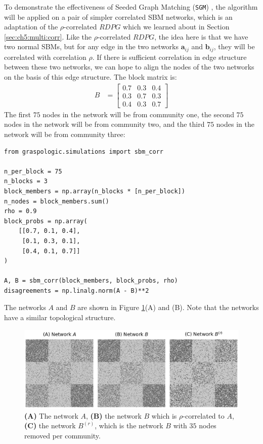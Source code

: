 To demonstrate the effectiveness of Seeded Graph Matching (\texttt{SGM}) \cite{Fishkind2019Mar, Lyzinski2014Jan}, the algorithm will be applied on a pair of simpler correlated SBM networks, which is an adaptation of the $\rho$-correlated $RDPG$ which we learned about in Section \ref{sec:ch5:multi:corr}. Like the $\rho$-correlated $RDPG$, the idea here is that we have two normal SBMs, but for any edge in the two networks $\mathbf a_{ij}$ and $\mathbf b_{ij}$, they will be correlated with correlation $\rho$. If there is sufficient correlation in edge structure between these two networks, we can hope to align the nodes of the two networks on the basis of this edge structure. The block matrix is:
\begin{align*}
B &= \begin{bmatrix} 
0.7 & 0.3 & 0.4\\
0.3 & 0.7 & 0.3\\
0.4 & 0.3 & 0.7
\end{bmatrix}
\end{align*}
The first $75$ nodes in the network will be from community one, the second $75$ nodes in the network will be from community two, and the third $75$ nodes in the network will be from community three:

\begin{lstlisting}[style=python]
from graspologic.simulations import sbm_corr

n_per_block = 75
n_blocks = 3
block_members = np.array(n_blocks * [n_per_block])
n_nodes = block_members.sum()
rho = 0.9
block_probs = np.array(
    [[0.7, 0.1, 0.4], 
     [0.1, 0.3, 0.1], 
     [0.4, 0.1, 0.7]]
)

A, B = sbm_corr(block_members, block_probs, rho)
disagreements = np.linalg.norm(A - B)**2
\end{lstlisting}

The networks $A$ and $B$ are shown in Figure \ref{fig:ch8:gm:sgm:ex_nets}(A) and (B). Note that the networks have a similar topological structure. 
\begin{figure}[h]
    \centering
    \includegraphics[width=\linewidth]{applications/ch8/Images/gm_sgm_nets.png}
    \caption[Seeded graph matching, networks (unshuffled)]{\textbf{(A)} The network $A$, \textbf{(B)} the network $B$ which is $\rho$-correlated to $A$, \textbf{(C)} the network $B^{(r)}$, which is the network $B$ with $35$ nodes removed per community.}
    \label{fig:ch8:gm:sgm:ex_nets}
\end{figure}

